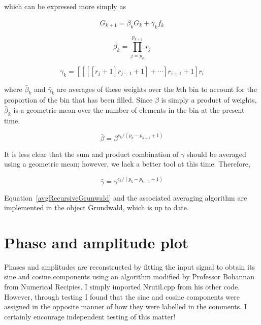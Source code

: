 \documentclass[12]{article}
\begin{document}
which can be expressed more simply as

\begin{equation}
G_{k+1} = \bar{\beta}_k G_k + \bar{\gamma}_k f_k
\label{avgRecursiveGrunwald}
\end{equation}

\begin{equation}
\beta_k = \prod_{j=p_k}^{p_{k+1}} r_j 
\label{beta}
\end{equation}

\begin{equation}
\gamma_k = [[[[r_j+1]r_{j-1}+1]+\cdots]r_{i+1}+1]r_i
\label{gamma}
\end{equation}

\noindent where $\bar{\beta}_k$ and $\bar{\gamma}_k$ are averages of
these weights over the $k$th bin to account for the proportion of the
bin that has been filled. Since $\beta$ is simply a product of
weights, $\bar{\beta}_k$ is a geometric mean over the number of
elements in the bin at the present time.

\begin{equation}
\bar{\beta} = \beta^{c_k/(p_k-p_{k-1}+1)}
\label{betabar}
\end{equation}

\noindent It is less clear that the sum and product combination of
$\gamma$ should be averaged using a geometric mean; however, we lack a
better tool at this time. Therefore,

\begin{equation}
\bar{\gamma} = \gamma^{c_k/(p_k-p_{k-1}+1)}
\label{gammabar}
\end{equation}

Equation~\ref{avgRecursiveGrunwald} and the associated averaging
algorithm are implemented in the object Grundwald, which is up to
date.

\section{Phase and amplitude plot}

Phases and amplitudes are reconstructed by fitting the input signal to
obtain its sine and cosine components using an algorithm modified by
Professor Bohannan from Numerical Recipies. I simply imported
Nrutil.cpp from his other code. However, through testing I found that
the sine and cosine components were assigned in the opposite manner of
how they were labelled in the comments. I certainly encourage
independent testing of this matter!
\end{document}
